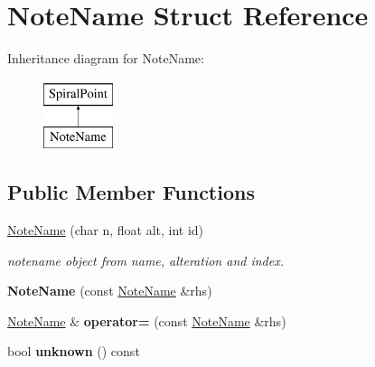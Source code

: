 \hypertarget{structNoteName}{}\section{Note\+Name Struct Reference}
\label{structNoteName}
Inheritance diagram for Note\+Name\+:\begin{figure}[H]
\begin{center}
\leavevmode
\includegraphics[height=2.000000cm]{structNoteName}
\end{center}
\end{figure}
\subsection*{Public Member Functions}
\begin{DoxyCompactItemize}
\item 
\mbox{\hyperlink{group__segment_gad81fd626f6b9bc6d70fd5e235ec5c8cb}{Note\+Name}} (char n, float alt, int id)
\begin{DoxyCompactList}\small\item\em notename object from name, alteration and index. \end{DoxyCompactList}\item 
{\bfseries Note\+Name} (const \mbox{\hyperlink{structNoteName}{Note\+Name}} \&rhs)
\item 
\mbox{\hyperlink{structNoteName}{Note\+Name}} \& {\bfseries operator=} (const \mbox{\hyperlink{structNoteName}{Note\+Name}} \&rhs)
\item 
\mbox{\label{structNoteName_a84a6beecda767f0481a0b4aa391c676c}} 
bool {\bfseries unknown} () const
\end{DoxyCompactItemize}
